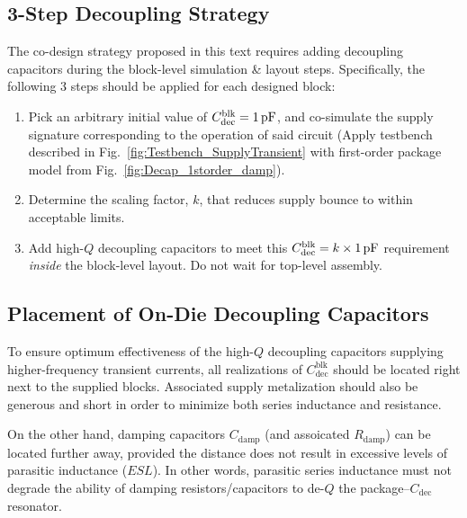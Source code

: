 \subsection{3-Step Decoupling Strategy}
\par The co-design strategy proposed in this text requires adding decoupling
capacitors during the block-level simulation \& layout steps. Specifically, the
following 3 steps should be applied for each designed block:
%
\begin{enumerate}[noitemsep]
\item Pick an arbitrary initial value of $C_\mathrm{dec}^\mathrm{blk}=1\mathrm{\,pF}$, and co-simulate the supply signature corresponding to the operation of said circuit (Apply testbench described in Fig.~\ref{fig:Testbench_SupplyTransient} with first-order package model from Fig.~\ref{fig:Decap_1storder_damp}).
\item Determine the scaling factor, $k$, that reduces supply bounce to within acceptable limits.
\item Add high-$Q$ decoupling capacitors to meet this $C_\mathrm{dec}^\mathrm{blk}=k\times 1\mathrm{\,pF}$ requirement \emph{inside} the block-level layout.  Do not wait for top-level assembly.
\end{enumerate}
%
\subsection{Placement of On-Die Decoupling Capacitors}
\par To ensure optimum effectiveness of the high-$Q$ decoupling capacitors
supplying higher-frequency transient currents, all realizations of
$C_\mathrm{dec}^\mathrm{blk}$ should be located right next to the supplied
blocks. Associated supply metalization should also be generous and short in
order to minimize both series inductance and resistance.
%
\par On the other hand, damping capacitors $C_\mathrm{damp}$ (and assoicated
$R_\mathrm{damp}$) can be located further away, provided the distance does
not result in excessive levels of parasitic inductance ($ESL$). In other words,
parasitic series inductance must not degrade the ability of damping
resistors/capacitors to de-$Q$ the package--$C_\mathrm{dec}$ resonator.
%
